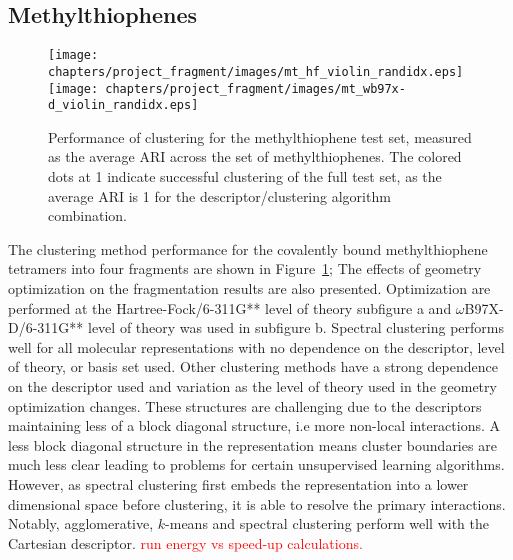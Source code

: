 

\subsection{Methylthiophenes}
\begin{figure}
    \centering
    \texttt{[image: chapters/project\_fragment/images/mt\_hf\_violin\_randidx.eps]}
    \texttt{[image: chapters/project\_fragment/images/mt\_wb97x-d\_violin\_randidx.eps]}
    \caption[Assessment of UML fragmentation for the methylthiophene test set]{Performance of clustering for the methylthiophene test set, measured as the average ARI across the set of methylthiophenes. The colored dots at 1 indicate successful clustering of the full test set, as the average ARI is 1 for the descriptor/clustering algorithm combination.}
    \label{fig:mt_avg}
\end{figure}


The clustering method performance for the covalently bound methylthiophene tetramers into four fragments are shown in Figure~\ref{fig:mt_avg};
The effects of geometry optimization on the fragmentation results are also presented. 
Optimization are performed at the Hartree-Fock/6-311G** level of theory subfigure a and  $\omega$B97X-D/6-311G** level of theory was used in subfigure b.
Spectral clustering performs well for all molecular representations with no dependence on the descriptor, level of theory, or basis set used. Other clustering methods have a strong dependence on the descriptor used and variation as the level of theory used in the geometry optimization changes. 
These structures are challenging due to the descriptors maintaining less of a block diagonal structure, i.e more non-local interactions.
A less block diagonal structure in the representation means cluster boundaries are much less clear leading to problems for certain unsupervised learning algorithms.
However, as spectral clustering first embeds the representation into a lower dimensional space before clustering, it is able to resolve the primary interactions.
Notably, agglomerative, $k$-means and spectral clustering perform well with the Cartesian descriptor.
\textcolor{red}{run energy vs speed-up calculations.}



